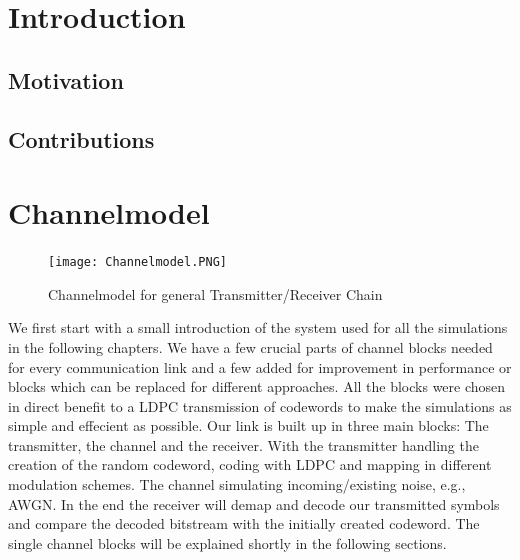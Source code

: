 \documentclass[12pt,oneside, reqno]{report}
\begin{document}
\tableofcontents

\newpage
\setlength{\baselineskip}{3ex}

\begin{spacing}{1.15}
\end{spacing}
\newpage
\thispagestyle{empty}
\null

\newpage
{}
\listoffigures

%

\newpage
\thispagestyle{empty}
\null
\newpage
\chapter{Introduction}
\section{Motivation}
\section{Contributions}

\newpage
\chapter{Channelmodel}
\label{sec:channel}
\begin{figure}[H]
	\centering
	\texttt{[image: Channelmodel.PNG]}
	\caption{Channelmodel for general Transmitter/Receiver Chain}
	\label{fig:Channelmodel}
\end{figure}
We first start with a small introduction of the system used for all the simulations in the following chapters. We have a few crucial parts of channel blocks needed for every communication link and a few added for improvement in performance or blocks which can be replaced for different approaches. All the blocks were chosen in direct benefit to a LDPC transmission of codewords to make the simulations as simple and effecient as possible. 
Our link is built up in three main blocks: The transmitter, the channel and the receiver. With the transmitter handling the creation of the random codeword, coding with \gls{LDPC} and mapping in different modulation schemes. The channel simulating incoming/existing noise, e.g., \gls{AWGN}. In the end the receiver will demap and decode our transmitted symbols and compare the decoded bitstream with the initially created codeword.
\newline
The single channel blocks will be explained shortly in the following sections.
\end{document}
